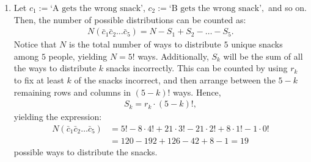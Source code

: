 \documentclass[12pt]{article}
\begin{document}
\begin{enumerate}
\begin{enumerate}
        Placing rooks on black squares (disallowed positions), we get
        $r_0 = 1,$ and $r_1 = 8.$

        For $r_k,$ $k \geq 2,$ we can either choose to include the
        top-right black square, or not. If we place a rook on it, the
        remainder of our board $B'$ has rook polynomial
        \begin{align*}
          (1+ x) \cdot (1 + 3x + x^2) = 1 + 4x + 4x^2 + x^3,
        \end{align*}
        whereas if we don't place a rook on it, the remainder of our
        new board $B''$ has rook polynomial:
        \begin{align*}
          (1 + 3x + x^2)^2(1 + x) &= (1 + 9x^2 + x^4 + 6x + 6x^3 +
          2x^2)(1 + x) \\
          &= (1 + 6x + 11x^2 + 6x^3 + x^4)(1 + x) \\
          &= 1 + 7x + 17x^2 + 17x^3 + 7x^4 + x^5
        \end{align*}
        Because $r_k = r_{k -1, B'} + r_{k, B''},$ or equivalently,
        $$R(\bar C, x) = xR(B', x) + R(B'', x),$$ we can compute
        $r_k$ from the coefficients of
        \begin{align*}
          &x(1 + 4x + 4x^2 + x^3) + 1 + 7x + 17x^2 + 17x^3 + 7x^4 + x^5 \\
          &= 1 + 8x + 21x^2 + 21x^3 + 8x^4 + x^5,
        \end{align*}
        yielding a new rook polynomial given by:
        \begin{align*}
          R(\bar C, x) = 1 + 8x + 21x^2 + 21x^3 + 8x^4 + x^5.
        \end{align*}

      \item Let $c_1 := \text{`A gets the wrong snack'}$, $c_2 :=
        \text{`B gets the wrong snack'},$ and so on. Then, the number
        of possible distributions can be counted as:
        \begin{align*}
          N(\bar c_1 \bar c_2 \ldots \bar c_5) = N - S_1 + S_2 - \ldots -S_5.
        \end{align*}
        Notice that $N$ is the total number of ways to distribute $5$
        unique snacks among $5$ people, yielding $N = 5!$ ways.
        Additionally, $S_k$ will be the sum of all the ways to
        distribute $k$ snacks incorrectly. This can be counted by
        using $r_k$ to fix at least $k$ of the snacks incorrect, and
        then arrange between the $5 -k$ remaining rows and columns in
        $(5 - k)!$ ways. Hence,
        \begin{align*}
          S_k = r_k \cdot (5 -k)!,
        \end{align*}
        yielding the expression:
        \begin{align*}
          N(\bar c_1 \bar c_2 \ldots \bar c_5)  &= 5! - 8\cdot 4! +
          21 \cdot 3! - 21 \cdot 2! + 8 \cdot 1! - 1 \cdot 0! \\
          &= 120 - 192 + 126 - 42 + 8 - 1 = 19
        \end{align*}
        possible ways to distribute the snacks.
    \end{enumerate}
\end{enumerate}
\end{document}

